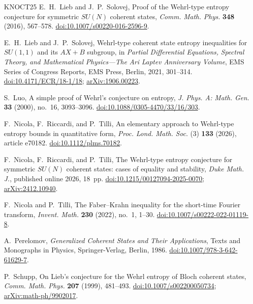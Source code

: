\documentclass[11pt,reqno]{amsart}
\numberwithin{equation}{section}
\theoremstyle{plain}
\theoremstyle{remark}
\begin{document}
\begin{thebibliography}{KNOCT25}
E.~H.~Lieb and J.~P.~Solovej,
Proof of the Wehrl-type entropy conjecture for symmetric $SU(N)$ coherent
states,
\emph{Comm. Math. Phys.} \textbf{348} (2016), 567--578.
\href{https://doi.org/10.1007/s00220-016-2596-9}{doi:10.1007/s00220-016-2596-9}.

E.~H.~Lieb and J.~P.~Solovej,
Wehrl-type coherent state entropy inequalities for $SU(1,1)$ and its
$AX+B$ subgroup,
in \emph{Partial Differential Equations, Spectral Theory, and Mathematical
Physics---The Ari Laptev Anniversary Volume},
EMS Series of Congress Reports, EMS Press, Berlin, 2021, 301--314.
\href{https://doi.org/10.4171/ECR/18-1/18}{doi:10.4171/ECR/18-1/18};
\href{https://arxiv.org/abs/1906.00223}{arXiv:1906.00223}.

S.~Luo,
A simple proof of Wehrl's conjecture on entropy,
\emph{J. Phys. A: Math. Gen.} \textbf{33} (2000), no.~16, 3093--3096.
\href{https://doi.org/10.1088/0305-4470/33/16/303}{doi:10.1088/0305-4470/33/16/303}.

F.~Nicola, F.~Riccardi, and P.~Tilli,
An elementary approach to Wehrl-type entropy bounds in quantitative form,
\emph{Proc. Lond. Math. Soc.} (3) \textbf{133} (2026), article e70182.
\href{https://doi.org/10.1112/plms.70182}{doi:10.1112/plms.70182}.

F.~Nicola, F.~Riccardi, and P.~Tilli,
The Wehrl-type entropy conjecture for symmetric $SU(N)$ coherent states:
cases of equality and stability,
\emph{Duke Math. J.}, published online 2026, 18~pp.
\href{https://doi.org/10.1215/00127094-2025-0070}{doi:10.1215/00127094-2025-0070};
\href{https://arxiv.org/abs/2412.10940}{arXiv:2412.10940}.

F.~Nicola and P.~Tilli,
The Faber--Krahn inequality for the short-time Fourier transform,
\emph{Invent. Math.} \textbf{230} (2022), no.~1, 1--30.
\href{https://doi.org/10.1007/s00222-022-01119-8}{doi:10.1007/s00222-022-01119-8}.

A.~Perelomov,
\emph{Generalized Coherent States and Their Applications},
Texts and Monographs in Physics, Springer-Verlag, Berlin, 1986.
\href{https://doi.org/10.1007/978-3-642-61629-7}{doi:10.1007/978-3-642-61629-7}.

P.~Schupp,
On Lieb's conjecture for the Wehrl entropy of Bloch coherent states,
\emph{Comm. Math. Phys.} \textbf{207} (1999), 481--493.
\href{https://doi.org/10.1007/s002200050734}{doi:10.1007/s002200050734};
\href{https://arxiv.org/abs/math-ph/9902017}{arXiv:math-ph/9902017}.


\end{thebibliography}
\end{document}
